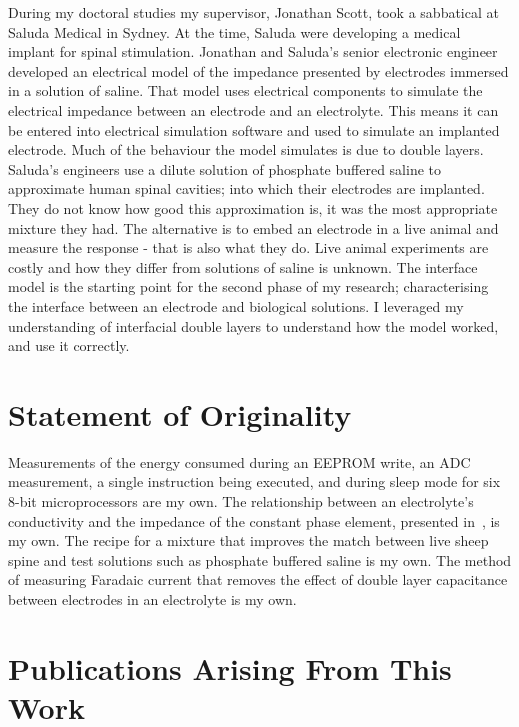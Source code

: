   During my doctoral studies my supervisor, Jonathan Scott, took a sabbatical at Saluda Medical in Sydney.
  At the time, Saluda were developing a medical implant for spinal stimulation.
  Jonathan and Saluda's senior electronic engineer developed an electrical model of the impedance presented by electrodes immersed in a solution of saline.
  That model uses electrical components to simulate the electrical impedance between an electrode and an electrolyte.
  This means it can be entered into electrical simulation software and used to simulate an implanted electrode.
  Much of the behaviour the model simulates is due to double layers.
  Saluda's engineers use a dilute solution of phosphate buffered saline to approximate human spinal cavities; into which their electrodes are implanted.
  They do not know how good this approximation is, it was the most appropriate mixture they had.
  The alternative is to embed an electrode in a live animal and measure the response - that is also what they do.
  Live animal experiments are costly and how they differ from solutions of saline is unknown.
  The interface model is the starting point for the second phase of my research; characterising the interface between an electrode and biological solutions.
  I leveraged my understanding of interfacial double layers to understand how the model worked, and use it correctly.


\section{Statement of Originality}


  Measurements of the energy consumed during an EEPROM write, an ADC measurement, a single instruction being executed, and during sleep mode for six 8-bit microprocessors are my own.
  The relationship between an electrolyte's conductivity and the impedance of the constant phase element, presented in~, is my own.
  The recipe for a mixture that improves the match between live sheep spine and test solutions such as phosphate buffered saline is my own.
  The method of measuring Faradaic current that removes the effect of double layer capacitance between electrodes in an electrolyte is my own.


\section{Publications Arising From This Work}


